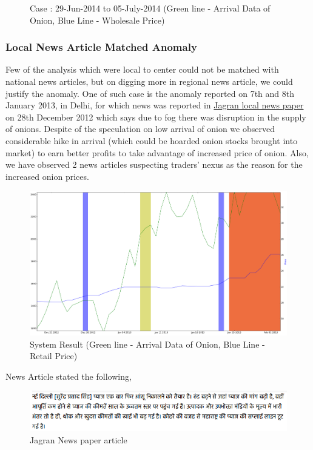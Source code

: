 \documentclass[a4paper,10pt]{article}
\begin{document}
\begin{itemize}
\begin{figure}[H]
      \caption{Case : 29-Jun-2014 to 05-July-2014 (Green line - Arrival Data of Onion, Blue Line - Wholesale Price)}
      \label{fig:Delhi_WSvsArrival_ill1}
      \end{figure}
\end{itemize}

\subsubsection{Local News Article Matched Anomaly}
Few of the analysis which were local to center could not be matched with national news articles, but on digging more in regional news article, we could justify the anomaly. One of such case is the anomaly reported on 7th and 8th January 2013, in Delhi, for which news was reported in \href{http://www.jagran.com/news/business-onion-price-affected-from-fog-9987751.html}{Jagran local news paper} on 28th December 2012 which says due to fog there was disruption in the supply of onions. Despite of the speculation on low arrival of onion we observed considerable hike in arrival (which could be hoarded onion stocks brought into market) to earn better profits to take advantage of increased price of onion. Also, we have observed 2 news articles suspecting traders' nexus as the reason for the increased onion prices.


			\begin{figure}[H]
		    	\centering
  		    	\includegraphics[width=1.1\textwidth]{graphs/localDelhiRegionalNewsPlusNexus.png}
		    	\caption{System Result (Green line - Arrival Data of Onion, Blue Line - Retail Price)}
		    	\label{fig:localExample}
			\end{figure}
			
News Article stated the following,

		\begin{figure}[H]
		    	\centering
  		    	\includegraphics[width=1.1\textwidth]{graphs/localDelhiFog.png}
		    	\caption{Jagran News paper article}
		    	\label{fig:localDelhiFog}
		\end{figure}
\end{document}

